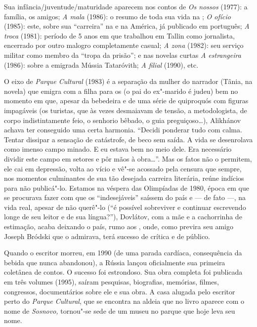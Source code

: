 {Sua infância/juventude/maturidade aparecem nos contos de \emph{Os
nossos} (1977): a família, os amigos; \emph{A mala} (1986): o resumo
de toda sua vida na ; \emph{O ofício} (1985): este, sobre sua
``carreira'' na  e na América, já publicado em português; \emph{A troca} (1981): período
de 5 anos em que trabalhou em Tallin como jornalista, encerrado por
outro malogro completamente casual; \emph{A zona} (1982): seu serviço
militar como membro da ``tropa da prisão''; e nas novelas curtas
\emph{A estrangeira} (1986): sobre a emigrada Mússia Tataróvith; \emph{A filial} (1990), etc.

O eixo de \emph{Parque Cultural} (1983) é a separação da mulher do
narrador (Tânia, na novela) que emigra com a filha para os  (o pai do
ex"-marido é judeu) bem no momento em que, apesar da bebedeira e de uma
série de quiproquós com figuras impagáveis (os turistas, que às vezes
desmaiavam de tensão, a metodologista, de corpo indistintamente feio, o
senhorio bêbado, o guia preguiçoso\ldots{}), Alikhánov achava ter conseguido
uma certa harmonia. ``Decidi ponderar tudo com calma. Tentar dissipar a
sensação de catástrofe, de beco sem saída. A vida se desenrolava como
imenso campo minado. E eu estava bem no meio dele. Era necessário
dividir este campo em setores e pôr mãos à obra\ldots{}''. Mas os fatos não o
permitem, ele cai em depressão, volta ao vício e vê"-se acossado pela
censura que sempre, nos momentos culminantes de sua tão desejada
carreira literária, reúne indícios para não publicá"-lo. Estamos na
véspera das Olimpíadas de 1980, época em que se procurava fazer com que
os ``indesejáveis'' saíssem do país e --- de fato ---, na vida real,
apesar de não querê"-lo (``é possível sobreviver e continuar escrevendo
longe de seu leitor e de sua língua?''), Dovlátov, com a mãe e a
cachorrinha de estimação, acaba deixando o país, rumo aos , onde, como
previra seu amigo Joseph Bródski que o admirava, terá sucesso de crítica
e de público.

Quando o escritor morreu, em 1990 (de uma parada cardíaca, consequência
da bebida que nunca abandonou), a Rússia lançou oficialmente sua
primeira coletânea de contos. O sucesso foi estrondoso. Sua obra
completa foi publicada em três volumes (1995), saíram pesquisas,
biografias, memórias, filmes, congressos, documentários sobre ele e sua
obra. A casa alugada pelo escritor perto do \emph{Parque Cultural}, que
se encontra na aldeia que no livro aparece com o nome de \emph{Sosnovo,}
tornou"-se sede de um museu no parque que hoje leva seu nome.

}
